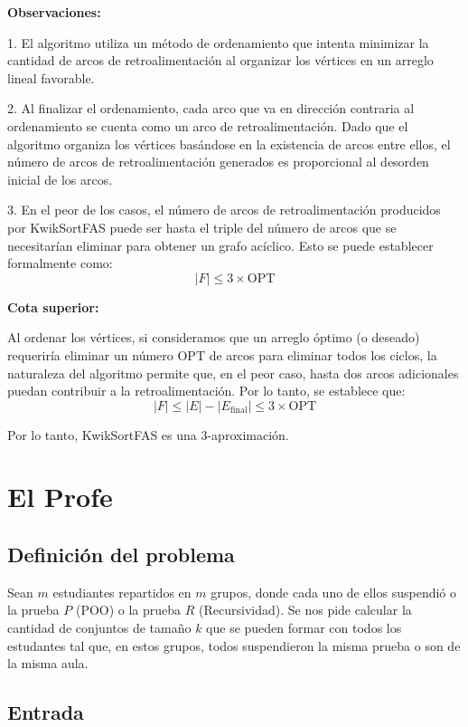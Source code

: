\documentclass{article}
\begin{document}
\textbf{Observaciones:}

1. El algoritmo utiliza un método de ordenamiento que intenta minimizar la cantidad de arcos de retroalimentación al organizar los vértices en un arreglo lineal favorable.
  
2. Al finalizar el ordenamiento, cada arco que va en dirección contraria al ordenamiento se cuenta como un arco de retroalimentación. Dado que el algoritmo organiza los vértices basándose en la existencia de arcos entre ellos, el número de arcos de retroalimentación generados es proporcional al desorden inicial de los arcos.

3. En el peor de los casos, el número de arcos de retroalimentación producidos por KwikSortFAS puede ser hasta el triple del número de arcos que se necesitarían eliminar para obtener un grafo acíclico. Esto se puede establecer formalmente como:
   \[
   |F| \leq 3 \times \text{OPT}
   \]

\textbf{Cota superior:}

Al ordenar los vértices, si consideramos que un arreglo óptimo (o deseado) requeriría eliminar un número \(\text{OPT}\) de arcos para eliminar todos los ciclos, la naturaleza del algoritmo permite que, en el peor caso, hasta dos arcos adicionales puedan contribuir a la retroalimentación. Por lo tanto, se establece que:
\[
|F| \leq |E| - |E_{\text{final}}| \leq 3 \times \text{OPT}
\]

Por lo tanto, KwikSortFAS es una 3-aproximación.



\section{El Profe}
\subsection{Definición del problema}

Sean $m$ estudiantes repartidos en $m$ grupos, donde cada uno de ellos suspendió o la prueba $P$ (POO) o la prueba $R$ (Recursividad). Se nos pide calcular la cantidad de conjuntos de tamaño $k$ que se pueden formar con todos los estudantes tal que, en estos grupos, todos suspendieron la misma prueba o son de la misma aula.

\subsection{Entrada}
\end{document}
